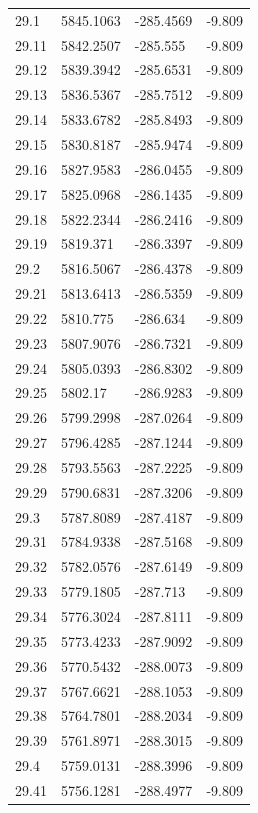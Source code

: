 \begin{table}[H]
\begin{tabular}{llll}
29.1 & 5845.1063 & -285.4569 & -9.809 \\
29.11 & 5842.2507 & -285.555 & -9.809 \\
29.12 & 5839.3942 & -285.6531 & -9.809 \\
29.13 & 5836.5367 & -285.7512 & -9.809 \\
29.14 & 5833.6782 & -285.8493 & -9.809 \\
29.15 & 5830.8187 & -285.9474 & -9.809 \\
29.16 & 5827.9583 & -286.0455 & -9.809 \\
29.17 & 5825.0968 & -286.1435 & -9.809 \\
29.18 & 5822.2344 & -286.2416 & -9.809 \\
29.19 & 5819.371 & -286.3397 & -9.809 \\
29.2 & 5816.5067 & -286.4378 & -9.809 \\
29.21 & 5813.6413 & -286.5359 & -9.809 \\
29.22 & 5810.775 & -286.634 & -9.809 \\
29.23 & 5807.9076 & -286.7321 & -9.809 \\
29.24 & 5805.0393 & -286.8302 & -9.809 \\
29.25 & 5802.17 & -286.9283 & -9.809 \\
29.26 & 5799.2998 & -287.0264 & -9.809 \\
29.27 & 5796.4285 & -287.1244 & -9.809 \\
29.28 & 5793.5563 & -287.2225 & -9.809 \\
29.29 & 5790.6831 & -287.3206 & -9.809 \\
29.3 & 5787.8089 & -287.4187 & -9.809 \\
29.31 & 5784.9338 & -287.5168 & -9.809 \\
29.32 & 5782.0576 & -287.6149 & -9.809 \\
29.33 & 5779.1805 & -287.713 & -9.809 \\
29.34 & 5776.3024 & -287.8111 & -9.809 \\
29.35 & 5773.4233 & -287.9092 & -9.809 \\
29.36 & 5770.5432 & -288.0073 & -9.809 \\
29.37 & 5767.6621 & -288.1053 & -9.809 \\
29.38 & 5764.7801 & -288.2034 & -9.809 \\
29.39 & 5761.8971 & -288.3015 & -9.809 \\
29.4 & 5759.0131 & -288.3996 & -9.809 \\
29.41 & 5756.1281 & -288.4977 & -9.809 \\

\end{tabular}
\end{table}
